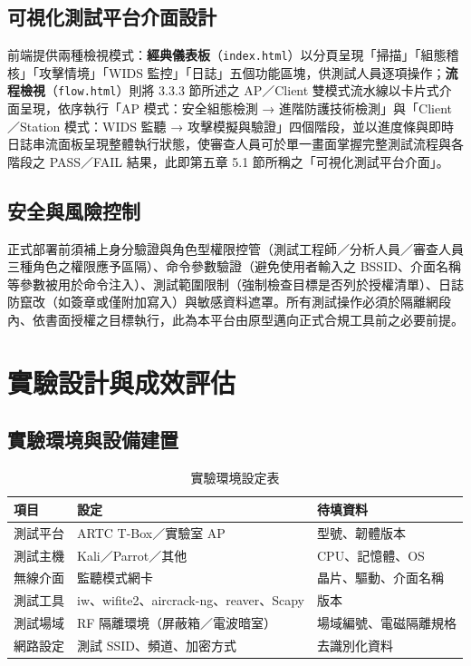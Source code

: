 \documentclass[12pt,a4paper,oneside]{report}
\begin{document}
\section{可視化測試平台介面設計}
前端提供兩種檢視模式：\textbf{經典儀表板}（\texttt{index.html}）以分頁呈現「掃描」「組態稽核」「攻擊情境」「WIDS 監控」「日誌」五個功能區塊，供測試人員逐項操作；\textbf{流程檢視}（\texttt{flow.html}）則將 3.3.3 節所述之 AP／Client 雙模式流水線以卡片式介面呈現，依序執行「AP 模式：安全組態檢測 → 進階防護技術檢測」與「Client／Station 模式：WIDS 監聽 → 攻擊模擬與驗證」四個階段，並以進度條與即時日誌串流面板呈現整體執行狀態，使審查人員可於單一畫面掌握完整測試流程與各階段之 PASS／FAIL 結果，此即第五章 5.1 節所稱之「可視化測試平台介面」。

\section{安全與風險控制}
正式部署前須補上身分驗證與角色型權限控管（測試工程師／分析人員／審查人員三種角色之權限應予區隔）、命令參數驗證（避免使用者輸入之 BSSID、介面名稱等參數被用於命令注入）、測試範圍限制（強制檢查目標是否列於授權清單）、日誌防竄改（如簽章或僅附加寫入）與敏感資料遮罩。所有測試操作必須於隔離網段內、依書面授權之目標執行，此為本平台由原型邁向正式合規工具前之必要前提。

\chapter{實驗設計與成效評估}

\section{實驗環境與設備建置}
\begin{table}[htbp]
\centering
\caption{實驗環境設定表}
\begin{tabular}{p{}p{}p{}}
\toprule
項目 & 設定 & 待填資料 \\
\midrule
測試平台 & ARTC T-Box／實驗室 AP & 型號、韌體版本 \\
測試主機 & Kali／Parrot／其他 & CPU、記憶體、OS \\
無線介面 & 監聽模式網卡 & 晶片、驅動、介面名稱 \\
測試工具 & iw、wifite2、aircrack-ng、reaver、Scapy & 版本 \\
測試場域 & RF 隔離環境（屏蔽箱／電波暗室） & 場域編號、電磁隔離規格 \\
網路設定 & 測試 SSID、頻道、加密方式 & 去識別化資料 \\
\bottomrule
\end{tabular}
\end{table}
\end{document}
